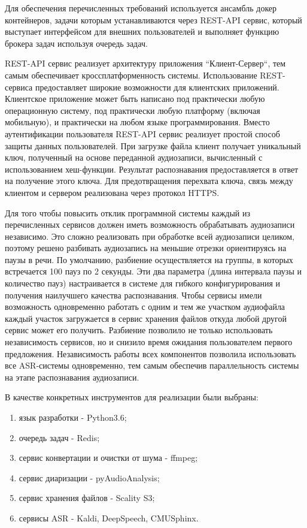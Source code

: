 \documentclass[conference]{IEEEtran}
\begin{document}
Для обеспечения перечисленных требований используется ансамбль докер контейнеров, задачи которым устанавливаются через REST-API сервис,
который выступает интерфейсом для внешних пользователей и выполняет функцию брокера задач используя очередь задач.

REST-API сервис реализует архитектуру приложения ``Клиент-Сервер``, тем самым обеспечивает кроссплатформенность системы.
Использование REST-сервиса предоставляет широкие возможности для клиентских приложений. Клиентское приложение может быть написано под практически любую операционную систему, под практически любую платформу (включая мобильную), и практически на любом языке программирования.
Вместо аутентификации пользователя REST-API сервис реализует простой способ защиты данных пользователей.
При загрузке файла клиент получает уникальный ключ, полученный на основе переданной аудиозаписи, вычисленный с использованием хеш-функции.
Результат распознавания предоставляется в ответ на получение этого ключа.
Для предотвращения перехвата ключа, связь между клиентом и сервером реализована через протокол HTTPS\@.

Для того чтобы повысить отклик программной системы каждый из перечисленных сервисов должен иметь возможность обрабатывать аудиозаписи независимо.
Это сложно реализовать при обработке всей аудиозаписи целиком, поэтому решено разбивать аудиозапись на меньшие отрезки ориентируясь на паузы в речи.
По умолчанию, разбиение осуществляется на группы, в которых встречается 100 пауз по 2 секунды. Эти два параметра (длина интервала паузы и количество пауз) настраивается в системе для гибкого конфигурирования и получения наилучшего качества распознавания.
Чтобы сервисы имели возможность одновременно работать с одним и тем же участком аудиофайла каждый участок загружается в сервис хранения файлов откуда любой другой сервис может его получить.
Разбиение позволило не только использовать независимость сервисов, но и снизило время ожидания пользователем первого предложения.
Независимость работы всех компонентов позволила использовать все ASR-системы одновременно, тем самым обеспечив параллельность системы на этапе распознавания аудиозаписи.

В качестве конкретных инструментов для реализации были выбраны:

\begin{enumerate}
\item язык разработки - Python3.6;
\item очередь задач - Redis;
\item сервис конвертации и очистки от шума - ffmpeg;
\item сервис диаризации - pyAudioAnalysis;
\item сервис хранения файлов - Scality S3;
\item сервисы ASR - Kaldi, DeepSpeech, CMUSphinx.
\end{enumerate}
\end{document}
